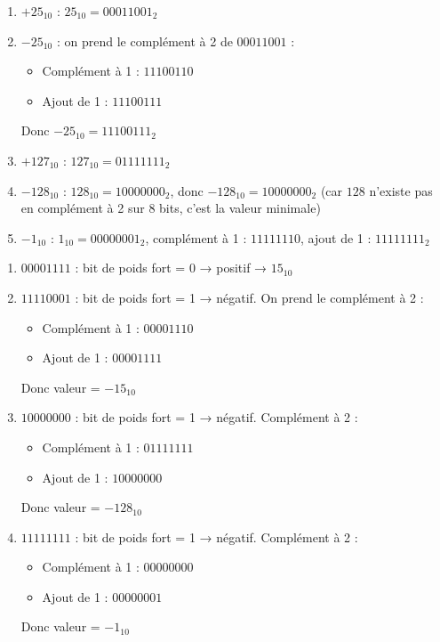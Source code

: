 \begin{enumerate}
    \item $+25_{10}$ : $25_{10} = 00011001_2$
    \item $-25_{10}$ : on prend le complément à 2 de $00011001$ :
    \begin{itemize}
        \item Complément à 1 : $11100110$
        \item Ajout de 1 : $11100111$
    \end{itemize}
    Donc $-25_{10} = 11100111_2$
    
    \item $+127_{10}$ : $127_{10} = 01111111_2$
    \item $-128_{10}$ : $128_{10} = 10000000_2$, donc $-128_{10} = 10000000_2$ (car $128$ n'existe pas en complément à 2 sur 8 bits, c'est la valeur minimale)
    \item $-1_{10}$ : $1_{10} = 00000001_2$, complément à 1 : $11111110$, ajout de 1 : $11111111_2$
\end{enumerate}

\begin{enumerate}
    \item $00001111$ : bit de poids fort = 0 → positif → $15_{10}$
    \item $11110001$ : bit de poids fort = 1 → négatif. On prend le complément à 2 :
    \begin{itemize}
        \item Complément à 1 : $00001110$
        \item Ajout de 1 : $00001111$
    \end{itemize}
    Donc valeur = $-15_{10}$
    
    \item $10000000$ : bit de poids fort = 1 → négatif. Complément à 2 :
    \begin{itemize}
        \item Complément à 1 : $01111111$
        \item Ajout de 1 : $10000000$
    \end{itemize}
    Donc valeur = $-128_{10}$
    
    \item $11111111$ : bit de poids fort = 1 → négatif. Complément à 2 :
    \begin{itemize}
        \item Complément à 1 : $00000000$
        \item Ajout de 1 : $00000001$
    \end{itemize}
    Donc valeur = $-1_{10}$
\end{enumerate}


